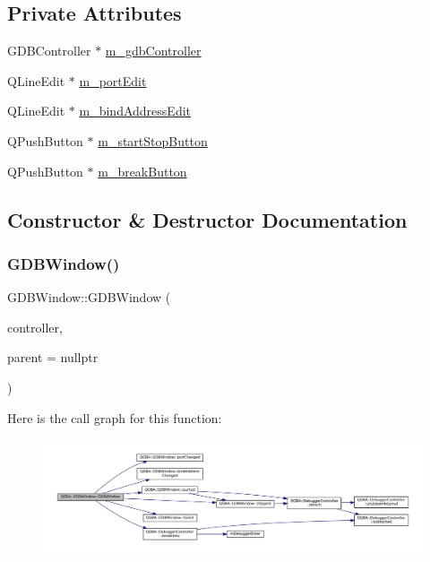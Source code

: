 \subsection*{Private Attributes}
\begin{DoxyCompactItemize}
\item 
G\+D\+B\+Controller $\ast$ \mbox{\hyperlink{class_q_g_b_a_1_1_g_d_b_window_a885339a0843020159375db6d70bb2273}{m\+\_\+gdb\+Controller}}
\item 
Q\+Line\+Edit $\ast$ \mbox{\hyperlink{class_q_g_b_a_1_1_g_d_b_window_a6b3b40be2a09ddc4b03257b60e00fd35}{m\+\_\+port\+Edit}}
\item 
Q\+Line\+Edit $\ast$ \mbox{\hyperlink{class_q_g_b_a_1_1_g_d_b_window_aa11f864f94d87111679b21ffd9b40181}{m\+\_\+bind\+Address\+Edit}}
\item 
Q\+Push\+Button $\ast$ \mbox{\hyperlink{class_q_g_b_a_1_1_g_d_b_window_ac06e617e881018e6db28a969d551ba8b}{m\+\_\+start\+Stop\+Button}}
\item 
Q\+Push\+Button $\ast$ \mbox{\hyperlink{class_q_g_b_a_1_1_g_d_b_window_aabe5ebd4593b29ee805d6bed9cb64dc1}{m\+\_\+break\+Button}}
\end{DoxyCompactItemize}


\subsection{Constructor \& Destructor Documentation}
\mbox{\label{class_q_g_b_a_1_1_g_d_b_window_af3cbb68393ee6c2e651632197a83e90a}} 
\subsubsection{\texorpdfstring{G\+D\+B\+Window()}{GDBWindow()}}
{\footnotesize\ttfamily G\+D\+B\+Window\+::\+G\+D\+B\+Window (\begin{DoxyParamCaption}\item[{G\+D\+B\+Controller $\ast$}]{controller,  }\item[{Q\+Widget $\ast$}]{parent = {\ttfamily nullptr} }\end{DoxyParamCaption})}

Here is the call graph for this function\+:
\nopagebreak
\begin{figure}[H]
\begin{center}
\leavevmode
\includegraphics[width=350pt]{class_q_g_b_a_1_1_g_d_b_window_af3cbb68393ee6c2e651632197a83e90a_cgraph}
\end{center}
\end{figure}


